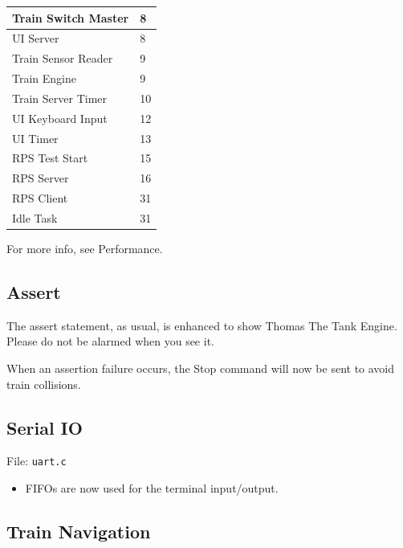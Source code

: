 \documentclass[letterpaper]{article}
\newlength{\DUtablewidth} %
\begin{document}
\begin{longtable*}[c]{|p{0.296\DUtablewidth}|p{0.133\DUtablewidth}|}
Train Switch Master
 & 
8
 \\
\hline

UI Server
 & 
8
 \\
\hline

Train Sensor Reader
 & 
9
 \\
\hline

Train Engine
 & 
9
 \\
\hline

Train Server Timer
 & 
10
 \\
\hline

UI Keyboard Input
 & 
12
 \\
\hline

UI Timer
 & 
13
 \\
\hline

RPS Test Start
 & 
15
 \\
\hline

RPS Server
 & 
16
 \\
\hline

RPS Client
 & 
31
 \\
\hline

Idle Task
 & 
31
 \\
\hline
\end{longtable*}

For more info, see Performance.


\subsection{Assert%
  \label{assert}%
}

The assert statement, as usual, is enhanced to show Thomas The Tank Engine. Please do not be alarmed when you see it.

When an assertion failure occurs, the Stop command will now be sent to avoid train collisions.


\subsection{Serial IO%
  \label{serial-io}%
}

File: \texttt{uart.c}
%
\begin{itemize}

\item FIFOs are now used for the terminal input/output.

\end{itemize}


\subsection{Train Navigation%
  \label{train-navigation}%
}
\end{document}

